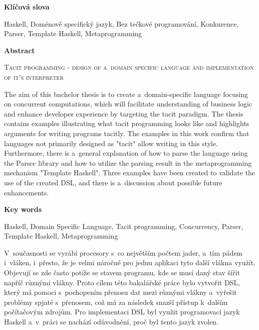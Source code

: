 \documentclass[male, czech]{kithesis}
\newcommand{\TITULen}{Tacit programming - design of a~domain specific language and implementation of it's interpreter} %
\begin{document}

\textbf{\textsf{Klíčová slova}}

Haskell, Doménově specifický jazyk, Bez tečkové programování, Konkurence, Parser, Template Haskell, Metaprogramming


\vspace{1em}
\hrulefill
\vspace{1em}

\textbf{\textsf{Abstract}}

\textsc{\TITULen}


The aim of this bachelor thesis is to create
a~domain-specific language focusing on concurrent computations, 
which will facilitate understanding of business logic and 
enhance developer experience by targeting the tacit paradigm. 
The thesis contains examples illustrating what 
tacit programming looks like and 
highlights arguments for writing programs tacitly. 
The examples in this work confirm that 
languages not primarily designed as "tacit" allow writing in this style.
Furthermore, 
there is a~general explanation 
of how to parse the language using the Parsec library and 
how to utilize the parsing result in 
the metaprogramming mechanism "Template Haskell". 
Three examples have been created to validate the use of the created DSL,
and there is a~discussion about possible future enhancements.

\textbf{\textsf{Key words}}

Haskell, Domain Specific Language, Tacit programming, Concurrency, Parser, Template Haskell, Metaprogramming

{
  \hypersetup{linkcolor=black}
  \tableofcontents
}


V~současnosti se vyrábí procesory s~co největším počtem jader, 
a~tím pádem i~vláken, 
i~přesto,
že je velmi náročné pro jednu aplikaci tyto další vlákna využít.
Objevují se zde často potíže se stavem programu,
kde se musí daný stav šířit napříč různými vlákny.
Proto cílem této bakalářské práce bylo vytvořit DSL, 
který má pomoci s~pochopením přenosu dat mezi různými vlákny
a~vyřešit problémy spjaté s~přenosem,
což má za následek snazší přístup k~dalším počítačovým zdrojům.
Pro implementaci DSL byl využit programovací jazyk Haskell
a~v~práci se nachází odůvodnění,
proč byl tento jazyk zvolen. 
\end{document}
